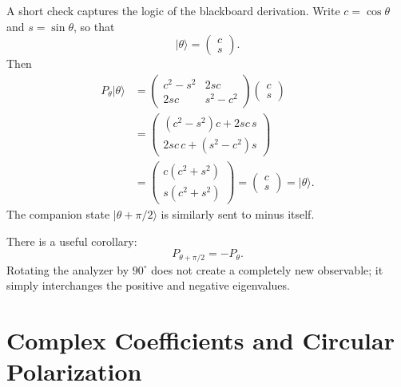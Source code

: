A short check captures the logic of the blackboard derivation. Write \(c=\cos\theta\) and \(s=\sin\theta\), so that
\begin{equation}
|\theta\rangle=
\begin{pmatrix}
c\\
s
\end{pmatrix}.
\end{equation}
Then
\begin{align}
P_\theta|\theta\rangle
&=
\begin{pmatrix}
c^2-s^2 & 2sc\\
2sc & s^2-c^2
\end{pmatrix}
\begin{pmatrix}
c\\
s
\end{pmatrix} \\
&=
\begin{pmatrix}
(c^2-s^2)c+2sc\,s\\
2sc\,c+(s^2-c^2)s
\end{pmatrix} \\
&=
\begin{pmatrix}
c(c^2+s^2)\\
s(c^2+s^2)
\end{pmatrix}
=
\begin{pmatrix}
c\\
s
\end{pmatrix}
=
|\theta\rangle.
\end{align}
The companion state \(|\theta+\pi/2\rangle\) is similarly sent to minus itself.

There is a useful corollary:
\begin{equation}
P_{\theta+\pi/2}=-P_\theta.
\end{equation}
Rotating the analyzer by \(90^\circ\) does not create a completely new observable; it simply interchanges the positive and negative eigenvalues.

\section{Complex Coefficients and Circular Polarization}

